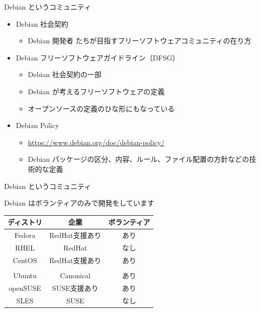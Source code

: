 \begin{frame}{Debian というコミュニティ}

\begin{itemize}
\item Debian 社会契約
  \begin{itemize}
  \item Debian 開発者 たちが目指すフリーソフトウェアコミュニティの在り方
  \end{itemize}
\item Debian フリーソフトウェアガイドライン（DFSG）
  \begin{itemize}
  \item Debian 社会契約の一部
  \item Debian が考えるフリーソフトウェアの定義
  \item オープンソースの定義のひな形にもなっている
  \end{itemize}
\item Debian Policy
  \begin{itemize}
  \item \url{https://www.debian.org/doc/debian-policy/}
  \item Debian パッケージの区分、内容、ルール、ファイル配置の方針などの技術的な定義
  \end{itemize}
\end{itemize}

\end{frame}


\begin{frame}{Debian というコミュニティ}

Debian はボランティアのみで開発をしています

\begin{table}[htb]
  \begin{tabular}{|c|c|c|}
    \hline
    ディストリ & 企業 & ボランティア \\ \hline
    Fedora & RedHat支援あり & あり  \\ \hline
    RHEL & RedHat & なし  \\ \hline
    CentOS & RedHat支援あり & あり \\ \hline
    \color{red}{Debian}  & \color{red}{なし} & \color{red}{あり} \\ \hline
    Ubuntu  & Canonical & あり \\ \hline
    openSUSE & SUSE支援あり & あり \\ \hline
    SLES & SUSE & なし \\ \hline
  \end{tabular}
\end{table}

\end{frame}


